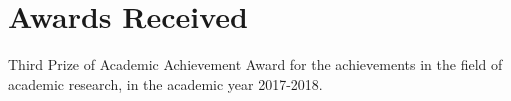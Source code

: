 \documentclass[master]{thesis-uestc}
\begin{document}


\printglossary

% 


\section*{\textbf{Awards Received}}
Third Prize of Academic Achievement Award for the achievements in the field of academic research, in the academic year 2017-2018.





\end{document}
